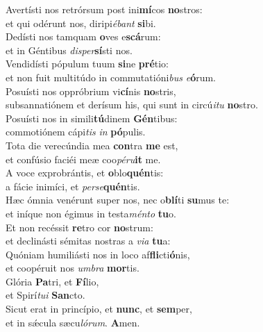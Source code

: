 \evenverse Avertísti nos retrórsum post ini\textbf{mí}cos \textbf{no}stros:~\*\\
\evenverse et qui odérunt nos, diripi\textit{é}\textit{bant} \textbf{si}bi.\\
\oddverse Dedísti nos tamquam \textbf{o}ves e\textbf{scá}rum:~\*\\
\oddverse et in Géntibus \textit{di}\textit{sper}\textbf{sí}sti nos.\\
\evenverse Vendidísti pópulum tuum \textbf{si}ne \textbf{pré}tio:~\*\\
\evenverse et non fuit multitúdo in commutatióni\textit{bus} \textit{e}\textbf{ó}rum.\\
\oddverse Posuísti nos oppróbrium vi\textbf{cí}nis \textbf{no}stris,~\*\\
\oddverse subsannatiónem et derísum his, qui sunt in circú\textit{i}\textit{tu} \textbf{no}stro.\\
\evenverse Posuísti nos in simili\textbf{tú}dinem \textbf{Gén}tibus:~\*\\
\evenverse commotiónem cápi\textit{tis} \textit{in} \textbf{pó}pulis.\\
\oddverse Tota die verecúndia mea \textbf{con}tra \textbf{me} est,~\*\\
\oddverse et confúsio faciéi meæ coo\textit{pé}\textit{ru}\textbf{it} me.\\
\evenverse A voce exprobrántis, et \textbf{o}blo\textbf{quén}tis:~\*\\
\evenverse a fácie inimíci, et \textit{per}\textit{se}\textbf{quén}tis.\\
\oddverse Hæc ómnia venérunt super nos, nec o\textbf{blí}ti \textbf{su}mus te:~\*\\
\oddverse et iníque non égimus in testa\textit{mén}\textit{to} \textbf{tu}o.\\
\evenverse Et non recéssit \textbf{re}tro cor \textbf{no}strum:~\*\\
\evenverse et declinásti sémitas nostras a \textit{vi}\textit{a} \textbf{tu}a:\\
\oddverse Quóniam humiliásti nos in loco af\textbf{fli}cti\textbf{ó}nis,~\*\\
\oddverse et coopéruit nos \textit{um}\textit{bra} \textbf{mor}tis.\\
\evenverse Glória \textbf{Pa}tri, et \textbf{Fí}lio,~\*\\
\evenverse et Spirí\textit{tu}\textit{i} \textbf{San}cto.\\
\oddverse Sicut erat in princípio, et \textbf{nunc}, et \textbf{sem}per,~\*\\
\oddverse et in sǽcula sæcu\textit{ló}\textit{rum}. \textbf{A}men.\\
